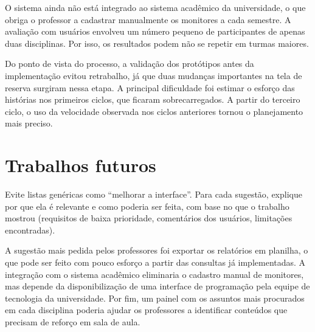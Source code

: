 O sistema ainda não está integrado ao sistema acadêmico da universidade, o que
obriga o professor a cadastrar manualmente os monitores a cada semestre. A
avaliação com usuários envolveu um número pequeno de participantes de apenas
duas disciplinas. Por isso, os resultados podem não se repetir em turmas maiores.

Do ponto de vista do processo, a validação dos protótipos antes da
implementação evitou retrabalho, já que duas mudanças importantes na tela de
reserva surgiram nessa etapa. A principal dificuldade foi estimar o esforço das
histórias nos primeiros ciclos, que ficaram sobrecarregados. A partir do
terceiro ciclo, o uso da velocidade observada nos ciclos anteriores tornou o
planejamento mais preciso.

\section{Trabalhos futuros}
\label{sec:conclusao:futuros}

\begin{instrucao}
Evite listas genéricas como ``melhorar a interface''. Para cada sugestão,
explique por que ela é relevante e como poderia ser feita, com base no que o
trabalho mostrou (requisitos de baixa prioridade, comentários dos usuários,
limitações encontradas).
\end{instrucao}

A sugestão mais pedida pelos professores foi exportar os relatórios em
planilha, o que pode ser feito com pouco esforço a partir das consultas já
implementadas. A integração com o sistema acadêmico eliminaria o cadastro
manual de monitores, mas depende da disponibilização de uma interface de
programação pela equipe de tecnologia da universidade. Por fim, um painel com
os assuntos mais procurados em cada disciplina poderia ajudar os professores a
identificar conteúdos que precisam de reforço em sala de aula.
